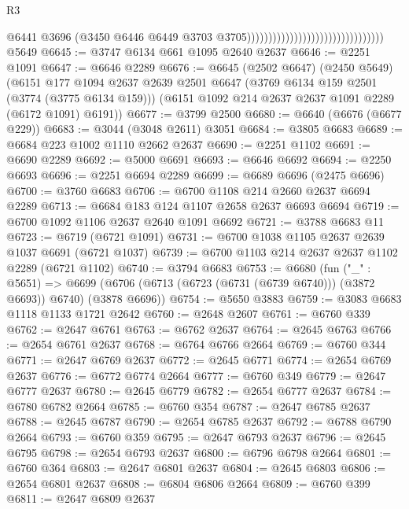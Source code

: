 \begin{lexlean}{R3}
\begin{coremodule}
                                                                  @6441
                                                                  @3696
                                                                  (@3450
                                                                    @6446
                                                                    @6449
                                                                    @3703
                                                                    @3705))))))))))))))))))))))))))))))))
    @5649
@6645 := @3747 @6134 @661 @1095 @2640 @2637
@6646 := @2251 @1091
@6647 := @6646 @2289
@6676 := @6645
    (@2502 @6647)
    (@2450 @5649)
    (@6151
      @177
      @1094
      @2637
      @2639
      @2501
      @6647
      (@3769 @6134 @159 @2501 (@3774 (@3775 @6134 @159)))
      (@6151 @1092 @214 @2637 @2637 @1091 @2289 (@6172 @1091) @6191))
@6677 := @3799 @2500
@6680 := @6640 (@6676 (@6677 @229))
@6683 := @3044 (@3048 @2611) @3051
@6684 := @3805 @6683
@6689 := @6684 @223 @1002 @1110 @2662 @2637
@6690 := @2251 @1102
@6691 := @6690 @2289
@6692 := @5000 @6691
@6693 := @6646 @6692
@6694 := @2250 @6693
@6696 := @2251 @6694 @2289
@6699 := @6689 @6696 (@2475 @6696)
@6700 := @3760 @6683
@6706 := @6700 @1108 @214 @2660 @2637 @6694 @2289
@6713 := @6684 @183 @124 @1107 @2658 @2637 @6693 @6694
@6719 := @6700 @1092 @1106 @2637 @2640 @1091 @6692
@6721 := @3788 @6683 @11
@6723 := @6719 (@6721 @1091)
@6731 := @6700 @1038 @1105 @2637 @2639 @1037 @6691 (@6721 @1037)
@6739 := @6700 @1103 @214 @2637 @2637 @1102 @2289 (@6721 @1102)
@6740 := @3794 @6683
@6753 := @6680
    (fun ("_" : @5651) =>
    @6699 (@6706 (@6713 (@6723 (@6731 (@6739 @6740))) (@3872 @6693)) @6740) (@3878 @6696))
@6754 := @5650 @3883
@6759 := @3083 @6683 @1118 @1133 @1721 @2642
@6760 := @2648 @2607
@6761 := @6760 @339
@6762 := @2647 @6761
@6763 := @6762 @2637
@6764 := @2645 @6763
@6766 := @2654 @6761 @2637
@6768 := @6764 @6766 @2664
@6769 := @6760 @344
@6771 := @2647 @6769 @2637
@6772 := @2645 @6771
@6774 := @2654 @6769 @2637
@6776 := @6772 @6774 @2664
@6777 := @6760 @349
@6779 := @2647 @6777 @2637
@6780 := @2645 @6779
@6782 := @2654 @6777 @2637
@6784 := @6780 @6782 @2664
@6785 := @6760 @354
@6787 := @2647 @6785 @2637
@6788 := @2645 @6787
@6790 := @2654 @6785 @2637
@6792 := @6788 @6790 @2664
@6793 := @6760 @359
@6795 := @2647 @6793 @2637
@6796 := @2645 @6795
@6798 := @2654 @6793 @2637
@6800 := @6796 @6798 @2664
@6801 := @6760 @364
@6803 := @2647 @6801 @2637
@6804 := @2645 @6803
@6806 := @2654 @6801 @2637
@6808 := @6804 @6806 @2664
@6809 := @6760 @399
@6811 := @2647 @6809 @2637

\end{coremodule}
\end{lexlean}

